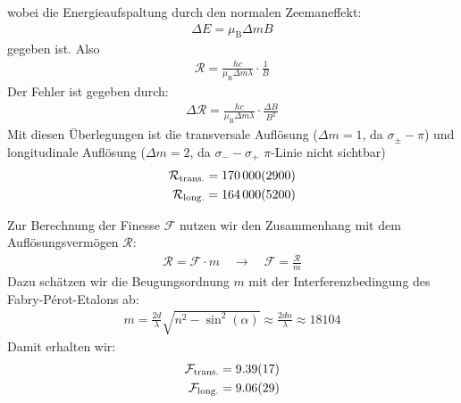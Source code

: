 \documentclass[11pt, a4paper]{article}
\begin{document}
wobei die Energieaufspaltung durch den normalen Zeemaneffekt:
\begin{align}
	\Delta E = \mu_\mathrm{B} \Delta m B
\end{align}
gegeben ist.
Also
\begin{align}
	\mathcal{R} = \frac{h c}{ \mu_\mathrm{B} \Delta m \lambda} \cdot \frac{1}{B} 
\end{align}
Der Fehler ist gegeben durch:
\begin{align}
	\Delta \mathcal{R} = \frac{h c}{ \mu_\mathrm{B} \Delta m \lambda} \cdot \frac{\Delta B}{B^2}
\end{align}
Mit diesen Überlegungen ist die transversale Auflösung ($\Delta m = 1$, da $\sigma_{\pm} - \pi$) und longitudinale Auflösung ($\Delta m = 2$, da $\sigma_{-} - \sigma_{+}$ $\pi$-Linie nicht sichtbar)
\begin{align}
	\mathcal{R}_\mathrm{trans.} = \num{170000 +- 2900} \\
	\mathcal{R}_\mathrm{long.} =\num{164000 +- 5200}
\end{align}

Zur Berechnung der Finesse $\mathcal{F}$ nutzen wir den Zusammenhang mit dem Auflösungsvermögen $\mathcal{R}$:
\begin{align}
	\mathcal{R} = \mathcal{F} \cdot m \quad \rightarrow \quad \mathcal{F} = \frac{\mathcal{R}}{m}
\end{align}
Dazu schätzen wir die Beugungsordnung $m$ mit der Interferenzbedingung des Fabry-Pérot-Etalons ab:
\begin{align}
	m = \frac{2 d}{\lambda} \sqrt{n^2 - \sin^2(\alpha)} \approx \frac{2 d n}{\lambda} \approx 18104
\end{align}
Damit erhalten wir:
\begin{align}
	\mathcal{F}_\mathrm{trans.} = \num{9.39 +- 0.17} \\
	\mathcal{F}_\mathrm{long.} = \num{9.06  +- 0.29}
\end{align}
\end{document}
